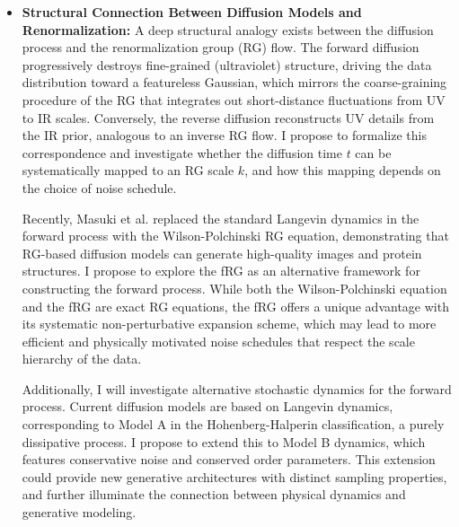 \documentclass[11pt,a4paper]{article}
\begin{document}
\begin{itemize}
    I propose to introduce the momentum-space correlation function as a complementary, physics-motivated metric for assessing image generation quality. Unlike FID, this metric is model-independent and directly quantifies how well a generative model reproduces the multi-scale spatial correlations present in the training data. I will systematically study the behavior of the propagator during the generation process for both lattice field configurations and natural images, and evaluate its effectiveness as a diagnostic tool for identifying mode collapse, scale-dependent artifacts, and other failure modes of generative models.

    \item \textbf{Structural Connection Between Diffusion Models and Renormalization:}
    A deep structural analogy exists between the diffusion process and the renormalization group (RG) flow. The forward diffusion progressively destroys fine-grained (ultraviolet) structure, driving the data distribution toward a featureless Gaussian, which mirrors the coarse-graining procedure of the RG that integrates out short-distance fluctuations from UV to IR scales. Conversely, the reverse diffusion reconstructs UV details from the IR prior, analogous to an inverse RG flow. I propose to formalize this correspondence and investigate whether the diffusion time $t$ can be systematically mapped to an RG scale $k$, and how this mapping depends on the choice of noise schedule.

    Recently, Masuki et al.\cite{masuki2025generativediffusionmodelinverse} replaced the standard Langevin dynamics in the forward process with the Wilson-Polchinski RG equation, demonstrating that RG-based diffusion models can generate high-quality images and protein structures. I propose to explore the fRG as an alternative framework for constructing the forward process. While both the Wilson-Polchinski equation and the fRG are exact RG equations, the fRG offers a unique advantage with its systematic non-perturbative expansion scheme, which may lead to more efficient and physically motivated noise schedules that respect the scale hierarchy of the data.

    Additionally, I will investigate alternative stochastic dynamics for the forward process. Current diffusion models are based on Langevin dynamics, corresponding to Model A in the Hohenberg-Halperin classification\cite{Hohenberg:1977ym}, a purely dissipative process. I propose to extend this to Model B dynamics, which features conservative noise and conserved order parameters. This extension could provide new generative architectures with distinct sampling properties, and further illuminate the connection between physical dynamics and generative modeling.
\end{itemize}
\end{document}
